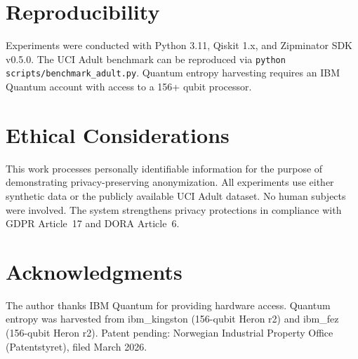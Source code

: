 \documentclass[acmsmall,screen,review,anonymous]{acmart}
\begin{document}
\section*{Reproducibility}
Experiments were conducted with Python 3.11, Qiskit 1.x, and Zipminator SDK v0.5.0. The UCI Adult benchmark can be reproduced via \texttt{python scripts/benchmark\_adult.py}. Quantum entropy harvesting requires an IBM Quantum account with access to a 156+ qubit processor.

\section*{Ethical Considerations}
This work processes personally identifiable information for the purpose of demonstrating privacy-preserving anonymization. All experiments use either synthetic data or the publicly available UCI Adult dataset. No human subjects were involved. The system strengthens privacy protections in compliance with GDPR Article~17 and DORA Article~6.

\section*{Acknowledgments}
The author thanks IBM Quantum for providing hardware access. Quantum entropy was harvested from ibm\_kingston (156-qubit Heron r2) and ibm\_fez (156-qubit Heron r2). Patent pending: Norwegian Industrial Property Office (Patentstyret), filed March 2026.



\end{document}
